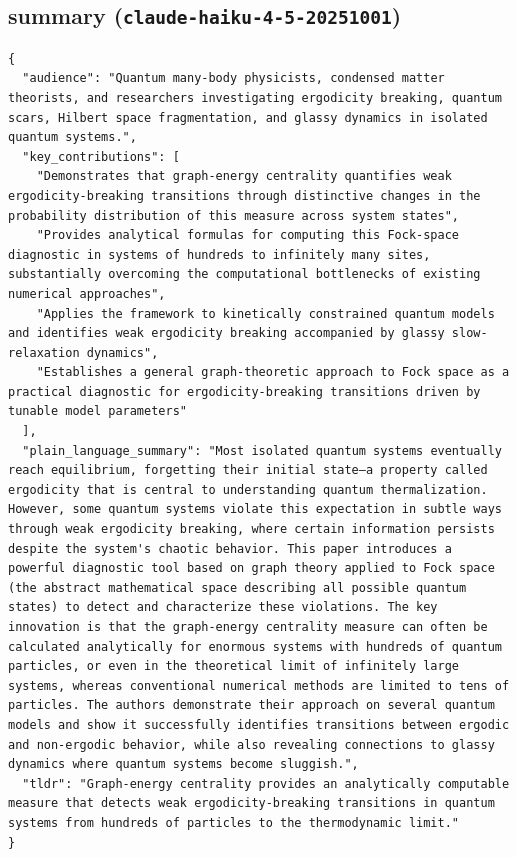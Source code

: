 \documentclass[11pt]{article}
\begin{document}
\subsection*{summary (\texttt{claude-haiku-4-5-20251001})}
\begin{verbatim}
{
  "audience": "Quantum many-body physicists, condensed matter theorists, and researchers investigating ergodicity breaking, quantum scars, Hilbert space fragmentation, and glassy dynamics in isolated quantum systems.",
  "key_contributions": [
    "Demonstrates that graph-energy centrality quantifies weak ergodicity-breaking transitions through distinctive changes in the probability distribution of this measure across system states",
    "Provides analytical formulas for computing this Fock-space diagnostic in systems of hundreds to infinitely many sites, substantially overcoming the computational bottlenecks of existing numerical approaches",
    "Applies the framework to kinetically constrained quantum models and identifies weak ergodicity breaking accompanied by glassy slow-relaxation dynamics",
    "Establishes a general graph-theoretic approach to Fock space as a practical diagnostic for ergodicity-breaking transitions driven by tunable model parameters"
  ],
  "plain_language_summary": "Most isolated quantum systems eventually reach equilibrium, forgetting their initial state—a property called ergodicity that is central to understanding quantum thermalization. However, some quantum systems violate this expectation in subtle ways through weak ergodicity breaking, where certain information persists despite the system's chaotic behavior. This paper introduces a powerful diagnostic tool based on graph theory applied to Fock space (the abstract mathematical space describing all possible quantum states) to detect and characterize these violations. The key innovation is that the graph-energy centrality measure can often be calculated analytically for enormous systems with hundreds of quantum particles, or even in the theoretical limit of infinitely large systems, whereas conventional numerical methods are limited to tens of particles. The authors demonstrate their approach on several quantum models and show it successfully identifies transitions between ergodic and non-ergodic behavior, while also revealing connections to glassy dynamics where quantum systems become sluggish.",
  "tldr": "Graph-energy centrality provides an analytically computable measure that detects weak ergodicity-breaking transitions in quantum systems from hundreds of particles to the thermodynamic limit."
}
\end{verbatim}
\end{document}
